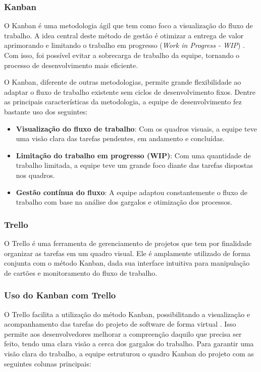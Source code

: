 \subsubsection{Kanban}
O Kanban é uma metodologia ágil que tem como foco a visualização do fluxo de trabalho. A idea central deste método de gestão é otimizar a entrega de valor aprimorando e limitando o trabalho em progresso (\textit{Work in Progress - WIP}) \cite{kanban2025}. Com isso, foi possível evitar a sobrecarga de trabalho da equipe, tornando o processo de desenvolvimento mais eficiente.

O Kanban, diferente de outras metodologias, permite grande flexibilidade ao adaptar o fluxo de trabalho existente sem ciclos de desenvolvimento fixos. Dentre as principais características da metodologia, a equipe de desenvolvimento fez bastante uso dos seguintes:

\begin{itemize}
    \item \textbf{Visualização do fluxo de trabalho}: Com os quadros visuais, a equipe teve uma visão clara das tarefas pendentes, em andamento e concluídas.
    \item \textbf{Limitação do trabalho em progresso (WIP)}: Com uma quantidade de trabalho limitada, a equipe teve um grande foco diante das tarefas dispostas nos quadros.
    \item \textbf{Gestão contínua do fluxo}: A equipe adaptou constantemente o fluxo de trabalho com base na análise dos gargalos e otimização dos processos.
\end{itemize}

\subsubsection{Trello}
O Trello é uma ferramenta de gerenciamento de projetos que tem por finalidade organizar as tarefas em um quadro visual. Ele é amplamente utilizado de forma conjunta com o método Kanban, dada sua interface intuitiva para manipulação de cartões e monitoramento do fluxo de trabalho.

\subsubsection{Uso do Kanban com Trello}
O Trello facilita a utilização do método Kanban, possibilitando a visualização e acompanhamento das tarefas do projeto de software de forma virtual \cite{campos2023trello}. Isso permite aos desenvolvedores melhorar a compreenção daquilo que precisa ser feito, tendo uma clara visão a cerca dos gargalos do trabalho. Para garantir uma visão clara do trabalho, a equipe estruturou o quadro Kanban do projeto com as seguintes colunas principais:

